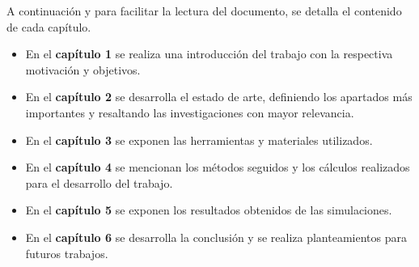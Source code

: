A continuación y para facilitar la lectura del documento, se detalla el contenido de cada capítulo.

\begin{itemize}
\item En el \textbf{capítulo 1} se realiza una introducción del trabajo con la respectiva motivación y objetivos.
\item En el \textbf{capítulo 2} se desarrolla el estado de arte, definiendo los apartados más importantes y resaltando las investigaciones con mayor relevancia.
\item En el \textbf{capítulo 3} se exponen las herramientas y materiales utilizados.
\item En el \textbf{capítulo 4} se mencionan los métodos seguidos y los cálculos realizados para el desarrollo del trabajo.
\item En el \textbf{capítulo 5} se exponen los resultados obtenidos de las simulaciones.
\item En el \textbf{capítulo 6} se desarrolla la conclusión y se realiza planteamientos para futuros trabajos.
\end{itemize}
